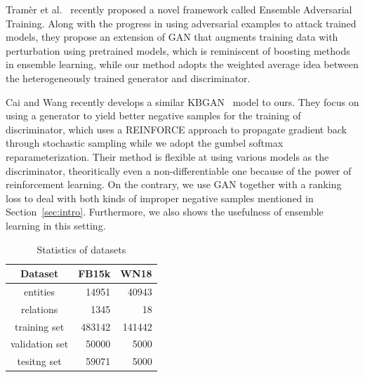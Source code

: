\documentclass[twocolumn,a4paper,10pt,preprint,3p]{elsarticle}
\begin{document}
Tram\`er et al.~\cite{EnsembleAdvTraining} recently proposed a novel framework called Ensemble Adversarial Training. Along with the progress in using adversarial examples to attack trained models, they propose an extension of GAN that augments training data with perturbation using pretrained models, which is reminiscent of boosting methods in ensemble learning, while our method adopts the weighted average idea between the heterogeneously trained generator and discriminator.

Cai and Wang recently develops a similar KBGAN~\cite{Cai2017KBGAN} model to ours. They focus on using a generator to yield better negative samples for the training of discriminator, which uses a REINFORCE approach to propagate gradient back through stochastic sampling while we adopt the gumbel softmax reparameterization. Their method is flexible at using various models as the discriminator, theoritically even a non-differentiable one because of the power of reinforcement learning. On the contrary, we use GAN together with a ranking loss to deal with both kinds of improper negative samples mentioned in Section~\ref{sec:intro}. Furthermore, we also shows the usefulness of ensemble learning in this setting.



\begin{table}[hbtp]
    \centering
    \begin{tabular}{crr}
        \toprule
        Dataset & FB15k & WN18 \\
        \midrule
        entities &  14951   &  40943  \\
        relations &  1345   & 18 \\
        training set &  483142   & 141442 \\
        validation set &  50000   & 5000 \\
        tesitng set &  59071  & 5000 \\
        \bottomrule
    \end{tabular}
    \caption{Statistics of datasets}
\label{datasets}
\end{table}
\end{document}
